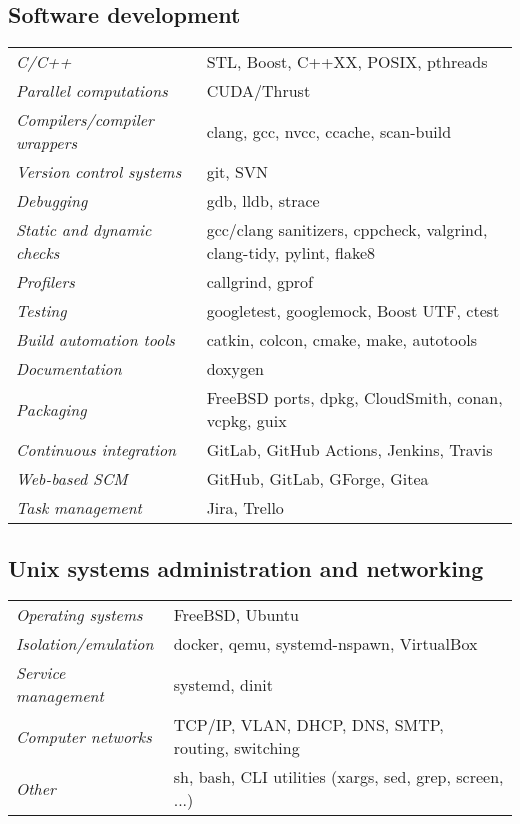 \documentclass[a4paper,10pt]{report}
\begin{document}
\begin{adjustwidth}{0.5cm}{0pt}
\subsection{Software development}
\begin{adjustwidth}{0.5cm}{0pt}
    \begin{tabularx}{\linewidth}{l X}
        {\it C/C++}                         & STL, Boost, C++XX, POSIX, pthreads\\
        {\it Parallel computations}         & CUDA/Thrust\\
        {\it Compilers/compiler wrappers}   & clang, gcc, nvcc, ccache, scan-build \\
        {\it Version control systems}       & git, SVN \\
        {\it Debugging}                     & gdb, lldb, strace \\
        {\it Static and dynamic checks}     & gcc/clang sanitizers, cppcheck, valgrind, clang-tidy, pylint, flake8 \\
        {\it Profilers}                     & callgrind, gprof \\
        {\it Testing}                       & googletest, googlemock, Boost UTF, ctest \\
        {\it Build automation tools}        & catkin, colcon, cmake, make, autotools \\
        {\it Documentation}                 & doxygen \\
        {\it Packaging}                     & FreeBSD ports, dpkg, CloudSmith, conan, vcpkg, guix \\
        {\it Continuous integration}        & GitLab, GitHub Actions, Jenkins, Travis \\
        {\it Web-based SCM}                 & GitHub, GitLab, GForge, Gitea \\
        {\it Task management}               & Jira, Trello
    \end{tabularx}
\end{adjustwidth}

\subsection{Unix systems administration and networking}
\begin{adjustwidth}{0.5cm}{0pt}
    \begin{tabularx}{\linewidth}{l X}
        {\it Operating systems}             & FreeBSD, Ubuntu\\
        {\it Isolation/emulation}           & docker, qemu, systemd-nspawn, VirtualBox\\
        {\it Service management}            & systemd, dinit\\
        {\it Computer networks}             & TCP/IP, VLAN, DHCP, DNS, SMTP, routing, switching\\
        {\it Other}                         & sh, bash, CLI utilities (xargs, sed, grep, screen, ...)
    \end{tabularx}
\end{adjustwidth}


\end{adjustwidth}
\end{document}

